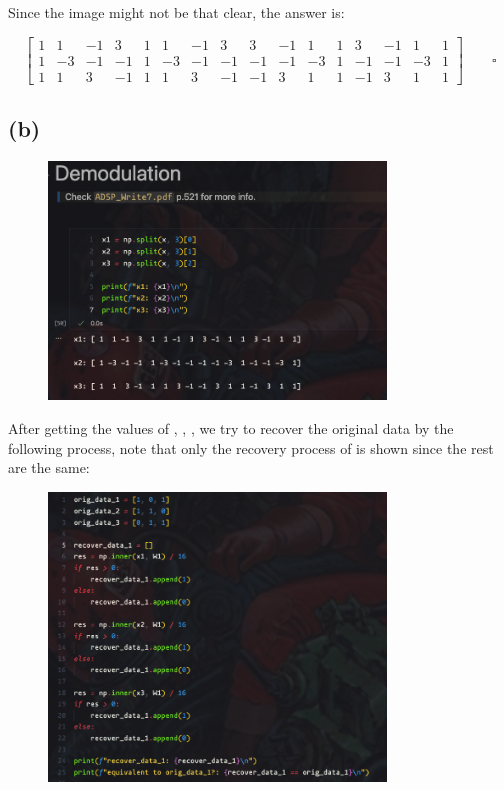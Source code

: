\documentclass{article}
\begin{document}
Since the image might not be that clear, 
the answer is:

\begin{equation*}
    \begin{bmatrix}
    1 & 1 & -1 & 3 & 1 & 1 & -1 & 3 & 3 & -1 & 1 & 1 & 3 & -1 & 1 & 1 \\
    1 & -3 & -1 & -1 & 1 & -3 & -1 & -1 & -1 & -1 & -3 & 1 & -1 & -1 & -3 & 1 \\
    1 & 1 & 3 & -1 & 1 & 1 & 3 & -1 & -1 & 3 & 1 & 1 & -1 & 3 & 1 & 1
    \end{bmatrix} \qquad \square
\end{equation*}


\subsection*{(b)}

\begin{figure}[H]
    \centering
    \includegraphics[width=0.8\textwidth]{HW5_img/7/demodulation.png}
\end{figure}

After getting the values of , , , 
we try to recover the original data by the following process, 
note that only the recovery process of  is shown since the rest are the same:

\begin{figure}[H]
    \centering
    \includegraphics[width=0.8\textwidth]{HW5_img/7/recover_process.png}
\end{figure}
\end{document}
